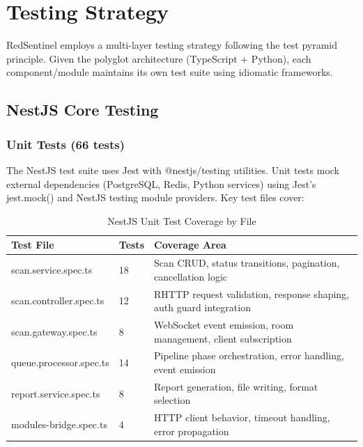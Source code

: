 \chapter{Testing Strategy}
RedSentinel employs a multi-layer testing strategy following the test pyramid principle. Given the polyglot architecture (TypeScript + Python), each component/module maintains its own test suite using idiomatic frameworks.
\section{NestJS Core Testing}
\subsection{Unit Tests (66 tests)}
The NestJS test suite uses Jest with @nestjs/testing utilities. Unit tests mock external dependencies (PostgreSQL, Redis, Python services) using Jest's jest.mock() and NestJS testing module providers. Key test files cover:

\begin{table}[H]
    \centering
    \begin{tabular}{|p{4cm}|p{2cm}|p{7cm}|}
      \hline
        Test File & Tests  &Coverage Area\\ \hline
        scan.service.spec.ts &18  & Scan CRUD, status transitions, pagination, cancellation logic\\ \hline
         scan.controller.spec.ts&12  &RHTTP request validation, response shaping, auth guard integration\\ \hline
        scan.gateway.spec.ts&8  & WebSocket event emission, room management, client subscription\\ \hline
         queue.processor.spec.ts & 14&Pipeline phase orchestration, error handling, event emission\\ \hline 
         report.service.spec.ts & 8 & Report generation, file writing, format selection \\ \hline
         modules-bridge.spec.ts & 4 &HTTP client behavior, timeout handling, error propagation \\ \hline
         
    \end{tabular}
    \caption{NestJS Unit Test Coverage by File}
    
\end{table}
